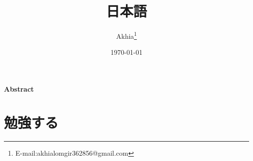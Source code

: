 \documentclass[UTF8,a4paper,12pt]{article}
\title{日本語}
\author{Akhia\thanks{E-mail:akhialomgir362856@gmail.com}}
\date{\today}
\begin{document}
\maketitle
\begin{center}
    \large\textbf{Abstract}
\end{center}
\newpage
\tableofcontents
\newpage
\section{勉強する}
\end{document}
